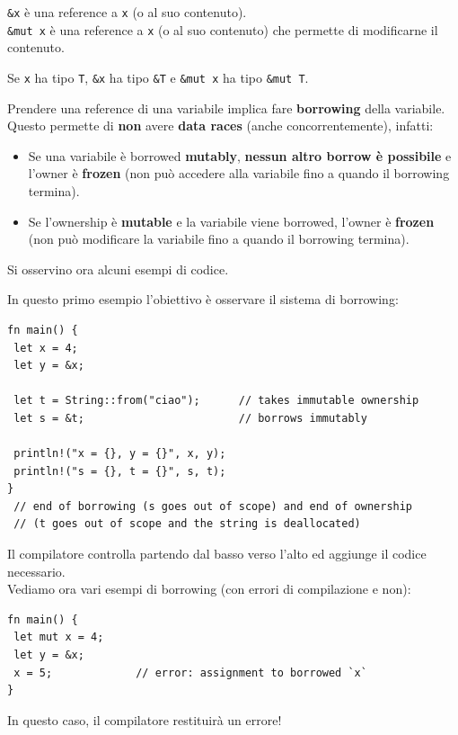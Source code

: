 \documentclass{article}
\begin{document}
\texttt{\&x} è una reference a \texttt{x} (o al suo contenuto).\\
\texttt{\&mut x} è una reference a \texttt{x} (o al suo contenuto) che permette di modificarne il contenuto.

Se \texttt{x} ha tipo \texttt{T}, \texttt{\&x} ha tipo \texttt{\&T} e \texttt{\&mut x} ha tipo \texttt{\&mut T}.

Prendere una reference di una variabile implica fare \textbf{borrowing} della variabile. Questo permette di \textbf{non} avere \textbf{data races} (anche concorrentemente), infatti:
\begin{itemize}
    \item Se una variabile è borrowed \textbf{mutably}, \textbf{nessun altro borrow è possibile} e l’owner è \textbf{frozen} (non può accedere alla variabile fino a quando il borrowing termina).
    \item Se l’ownership è \textbf{mutable} e la variabile viene borrowed, l’owner è \textbf{frozen} (non può modificare la variabile fino a quando il borrowing termina).
\end{itemize}

Si osservino ora alcuni esempi di codice.

\pagebreak

In questo primo esempio l'obiettivo è osservare il sistema di borrowing:
\begin{tcolorbox}
\begin{verbatim}
fn main() {
 let x = 4;
 let y = &x;

 let t = String::from("ciao");      // takes immutable ownership
 let s = &t;                        // borrows immutably

 println!("x = {}, y = {}", x, y);
 println!("s = {}, t = {}", s, t);
} 
 // end of borrowing (s goes out of scope) and end of ownership 
 // (t goes out of scope and the string is deallocated)
\end{verbatim}
\end{tcolorbox}
Il compilatore controlla partendo dal basso verso l'alto ed aggiunge il codice necessario.\vspace{14pt}\\
Vediamo ora vari esempi di borrowing (con errori di compilazione e non):
\begin{tcolorbox}
\begin{verbatim}
fn main() {
 let mut x = 4;
 let y = &x;
 x = 5;             // error: assignment to borrowed `x`
}
\end{verbatim}
\end{tcolorbox}
In questo caso, il compilatore restituirà un errore!\vspace{8pt}
\end{document}
